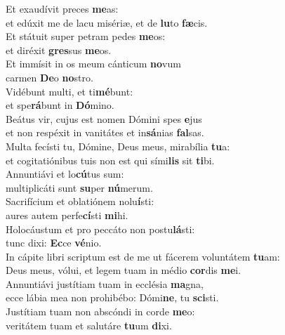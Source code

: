 \evenverse Et exaudívit preces \textbf{me}as:~\*\\
\evenverse et edúxit me de lacu misériæ, et de \textbf{lu}to \textbf{fæ}cis.\\
\oddverse Et státuit super petram pedes \textbf{me}os:~\*\\
\oddverse et diréxit \textbf{gres}sus \textbf{me}os.\\
\evenverse Et immísit in os meum cánticum \textbf{no}vum~\*\\
\evenverse carmen \textbf{De}o \textbf{no}stro.\\
\oddverse Vidébunt multi, et ti\textbf{mé}bunt:~\*\\
\oddverse et spe\textbf{rá}bunt in \textbf{Dó}mino.\\
\evenverse Beátus vir, cujus est nomen Dómini spes \textbf{e}jus~\*\\
\evenverse et non respéxit in vanitátes et in\textbf{sá}nias \textbf{fal}sas.\\
\oddverse Multa fecísti tu, Dómine, Deus meus, mirabília \textbf{tu}a:~\*\\
\oddverse et cogitatiónibus tuis non est qui sími\textbf{lis} sit \textbf{ti}bi.\\
\evenverse Annuntiávi et lo\textbf{cú}tus sum:~\*\\
\evenverse multiplicáti sunt \textbf{su}per \textbf{nú}merum.\\
\oddverse Sacrifícium et oblatiónem nolu\textbf{í}sti:~\*\\
\oddverse aures autem perfe\textbf{cí}sti \textbf{mi}hi.\\
\evenverse Holocáustum et pro peccáto non postu\textbf{lá}sti:~\*\\
\evenverse tunc dixi: \textbf{Ec}ce \textbf{vé}nio.\\
\oddverse In cápite libri scriptum est de me ut fácerem voluntátem \textbf{tu}am:~\*\\
\oddverse Deus meus, vólui, et legem tuam in médio \textbf{cor}dis \textbf{me}i.\\
\evenverse Annuntiávi justítiam tuam in ecclésia \textbf{ma}gna,~\*\\
\evenverse ecce lábia mea non prohibébo: Dómi\textbf{ne}, tu \textbf{sci}sti.\\
\oddverse Justítiam tuam non abscóndi in corde \textbf{me}o:~\*\\
\oddverse veritátem tuam et salutáre \textbf{tu}um \textbf{di}xi.\\
